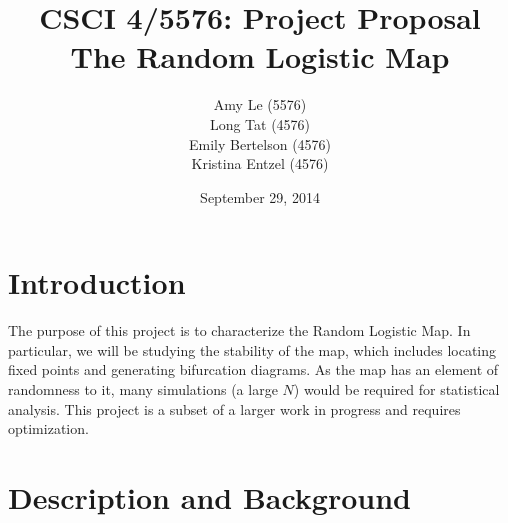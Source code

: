 \documentclass[12pt]{article}
\begin{document}
\pagestyle{plain} %
\title{CSCI 4/5576: Project Proposal \\ The Random Logistic Map}
\date{September 29, 2014}
\author{Amy Le (5576)\\Long Tat (4576)\\Emily Bertelson (4576)\\Kristina Entzel (4576)}
\maketitle

\section{Introduction}
The purpose of this project is to characterize the Random Logistic
Map. In particular, we will be studying the stability of the map,
which includes locating fixed points and generating bifurcation
diagrams. As the map has an element of randomness to it, many
simulations (a large $N$) would be required for statistical analysis. This project is a subset of a larger work in progress
and requires optimization.
\section{Description and Background}
\end{document}

